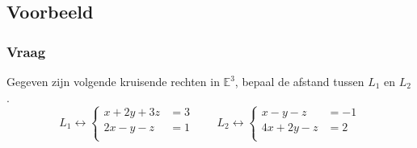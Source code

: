 \documentclass[main.tex]{subfiles}
\begin{document}
\subsection*{Voorbeeld}
\subsubsection*{Vraag}
\begin{center}
  Gegeven zijn volgende kruisende rechten in $\mathbb{E}^{3}$, bepaal de afstand tussen $L_{1}$ en $L_{2}$.
  \[
  L_{1} \leftrightarrow
  \left\{
    \begin{array}{cc}
      x+2y+3z&=3\\
      2x-y-z&=1\\
    \end{array}
  \right.
  \qquad
  L_{2} \leftrightarrow
  \left\{
    \begin{array}{cc}
      x-y-z&=-1\\
      4x+2y-z&=2\\
    \end{array}
  \right.
  \]
\end{center}
\end{document}
